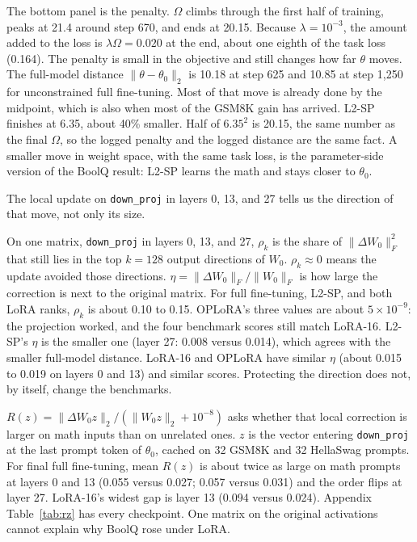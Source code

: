 \documentclass[10pt]{article}
\begin{document}
The bottom panel is the penalty.
$\Omega$ climbs through the first half of training, peaks at 21.4 around step 670, and ends at 20.15.
Because $\lambda=10^{-3}$, the amount added to the loss is $\lambda\Omega=0.020$ at the end, about one eighth of the task loss (0.164).
The penalty is small in the objective and still changes how far $\theta$ moves.
The full-model distance $\lVert\theta-\theta_0\rVert_2$ is 10.18 at step 625 and 10.85 at step 1{,}250 for unconstrained full fine-tuning.
Most of that move is already done by the midpoint, which is also when most of the GSM8K gain has arrived.
L2-SP finishes at 6.35, about 40\% smaller.
Half of $6.35^2$ is 20.15, the same number as the final $\Omega$, so the logged penalty and the logged distance are the same fact.
A smaller move in weight space, with the same task loss, is the parameter-side version of the BoolQ result: L2-SP learns the math and stays closer to $\theta_0$.

The local update on \texttt{down\_proj} in layers 0, 13, and 27 tells us the direction of that move, not only its size.

On one matrix, \texttt{down\_proj} in layers 0, 13, and 27, $\rho_k$ is the share of $\lVert\Delta W_0\rVert_F^2$ that still lies in the top $k=128$ output directions of $W_0$.
$\rho_k\approx 0$ means the update avoided those directions.
$\eta=\lVert\Delta W_0\rVert_F/\lVert W_0\rVert_F$ is how large the correction is next to the original matrix.
For full fine-tuning, L2-SP, and both LoRA ranks, $\rho_k$ is about 0.10 to 0.15.
OPLoRA's three values are about $5\times10^{-9}$: the projection worked, and the four benchmark scores still match LoRA-16.
L2-SP's $\eta$ is the smaller one (layer 27: 0.008 versus 0.014), which agrees with the smaller full-model distance.
LoRA-16 and OPLoRA have similar $\eta$ (about 0.015 to 0.019 on layers 0 and 13) and similar scores.
Protecting the direction does not, by itself, change the benchmarks.

$R(z)=\lVert\Delta W_0 z\rVert_2/(\lVert W_0 z\rVert_2+10^{-8})$ asks whether that local correction is larger on math inputs than on unrelated ones.
$z$ is the vector entering \texttt{down\_proj} at the last prompt token of $\theta_0$, cached on 32 GSM8K and 32 HellaSwag prompts.
For final full fine-tuning, mean $R(z)$ is about twice as large on math prompts at layers 0 and 13 (0.055 versus 0.027; 0.057 versus 0.031) and the order flips at layer 27.
LoRA-16's widest gap is layer 13 (0.094 versus 0.024).
Appendix Table~\ref{tab:rz} has every checkpoint.
One matrix on the original activations cannot explain why BoolQ rose under LoRA.
\end{document}
